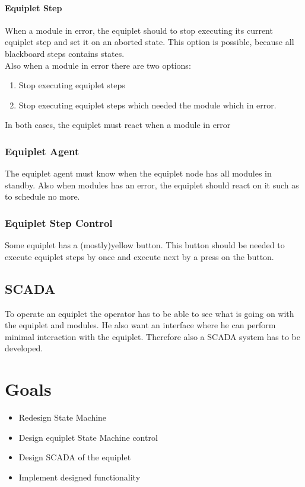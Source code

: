 \documentclass[12pt,a4paper]{report}
\begin{document}
\paragraph{Equiplet Step}When a module in error, the equiplet should to stop executing its current equiplet step and set it on an aborted state. This option is possible, because all blackboard steps contains states. 
\\Also when a module in error there are two options:
\begin{enumerate}
\item Stop executing equiplet steps
\item Stop executing equiplet steps which needed the module which in error.
\end{enumerate}
In both cases, the equiplet must react when a module in error
\subsubsection{Equiplet Agent}
The equiplet agent must know when the equiplet node has all modules in standby. Also when modules has an error, the equiplet should react on it such as to schedule no more.
\subsubsection{Equiplet Step Control}
Some equiplet has a (mostly)yellow button. This button should be needed to execute equiplet steps by once and execute next by a press on the button.

\subsection{SCADA}
To operate an equiplet the operator has to be able to see what is going on with the equiplet and modules. He also want an interface where he can perform minimal interaction with the equiplet. Therefore also a SCADA system has to be developed.

\section{Goals}
\begin{itemize}
\item Redesign State Machine
\item Design equiplet State Machine control
\item Design SCADA of the equiplet
\item Implement designed functionality
\end{itemize}
\end{document}
